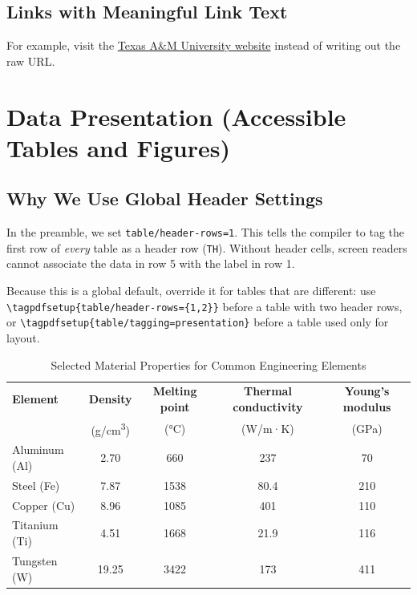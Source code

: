 \documentclass[11pt]{article}
\begin{document}
\subsection{Links with Meaningful Link Text}
For example, visit the \href{https://www.tamu.edu}{Texas A\&M University website} instead of writing out the raw URL.

\section{Data Presentation (Accessible Tables and Figures)}

\subsection{Why We Use Global Header Settings}
In the preamble, we set \texttt{table/header-rows=1}. This tells the compiler to tag the first row of \emph{every} table as a header row (\texttt{TH}). Without header cells, screen readers cannot associate the data in row 5 with the label in row 1.

Because this is a global default, override it for tables that are different: use \verb|\tagpdfsetup{table/header-rows={1,2}}| before a table with two header rows, or \verb|\tagpdfsetup{table/tagging=presentation}| before a table used only for layout.

\begin{table}[htbp]
    \caption{Selected Material Properties for Common Engineering Elements}
    \label{tab:material-properties}
    \centering
    \small
    \begin{tabular}{l c c c c}
        \toprule
        \textbf{Element} &
        \textbf{Density} &
        \textbf{Melting point} &
        \textbf{Thermal conductivity} &
        \textbf{Young's modulus} \\
         &
        (g/cm\textsuperscript{3}) &
        (°C) &
        (W/m·K) &
        (GPa) \\
        \midrule
        Aluminum (Al) & 2.70  & 660  & 237  & 70  \\
        Steel (Fe)    & 7.87  & 1538 & 80.4 & 210 \\
        Copper (Cu)   & 8.96  & 1085 & 401  & 110 \\
        Titanium (Ti) & 4.51  & 1668 & 21.9 & 116 \\
        Tungsten (W)  & 19.25 & 3422 & 173  & 411 \\
        \bottomrule
    \end{tabular}
\end{table}
\end{document}
